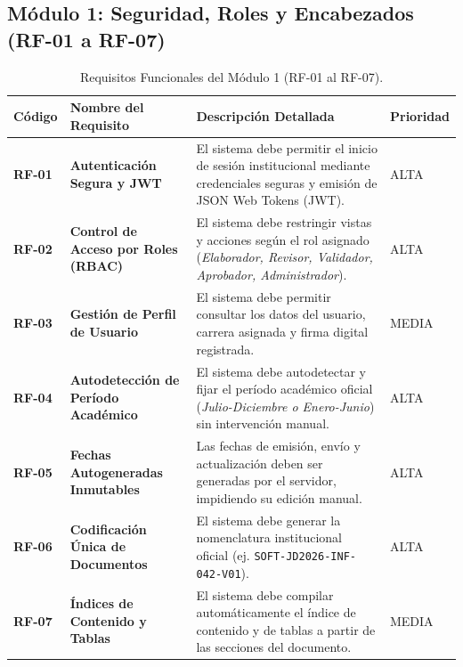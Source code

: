 \documentclass[12pt,a4paper]{article}
\begin{document}
\subsection{Módulo 1: Seguridad, Roles y Encabezados (RF-01 a RF-07)}
\begin{table}[htbp]
\centering
\small
\begin{tabularx}{\textwidth}{|>{\hsize=0.35\hsize\bfseries\centering\arraybackslash}X|>{\hsize=0.85\hsize\bfseries}X|>{\hsize=1.5\hsize}X|>{\hsize=0.3\hsize\centering\arraybackslash}X|}
    \hline
    \rowcolor{tableheader}
    Código & Nombre del Requisito & Descripción Detallada & Prioridad \\
    \hline
    RF-01 & Autenticación Segura y JWT & El sistema debe permitir el inicio de sesión institucional mediante credenciales seguras y emisión de JSON Web Tokens (JWT). & ALTA \\
    \hline
    RF-02 & Control de Acceso por Roles (RBAC) & El sistema debe restringir vistas y acciones según el rol asignado (\textit{Elaborador, Revisor, Validador, Aprobador, Administrador}). & ALTA \\
    \hline
    RF-03 & Gestión de Perfil de Usuario & El sistema debe permitir consultar los datos del usuario, carrera asignada y firma digital registrada. & MEDIA \\
    \hline
    RF-04 & Autodetección de Período Académico & El sistema debe autodetectar y fijar el período académico oficial (\textit{Julio-Diciembre o Enero-Junio}) sin intervención manual. & ALTA \\
    \hline
    RF-05 & Fechas Autogeneradas Inmutables & Las fechas de emisión, envío y actualización deben ser generadas por el servidor, impidiendo su edición manual. & ALTA \\
    \hline
    RF-06 & Codificación Única de Documentos & El sistema debe generar la nomenclatura institucional oficial (ej. \texttt{SOFT-JD2026-INF-042-V01}). & ALTA \\
    \hline
    RF-07 & Índices de Contenido y Tablas & El sistema debe compilar automáticamente el índice de contenido y de tablas a partir de las secciones del documento. & MEDIA \\
    \hline
\end{tabularx}
\caption{Requisitos Funcionales del Módulo 1 (RF-01 al RF-07).}
\label{tab:s1_03_rf_m1}
\end{table}
\end{document}
